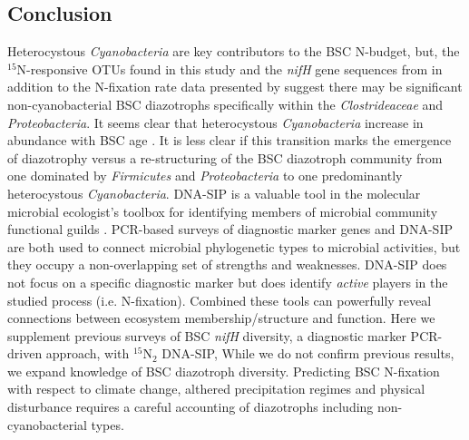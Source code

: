 \subsection{Conclusion}
Heterocystous \textit{Cyanobacteria} are key contributors to the BSC N-budget,
but, the $^{15}$N-responsive OTUs found in this study and the \textit{nifH}
gene sequences from \citet{Steppe_1996} in addition to the N-fixation rate data
presented by \citet{15643930} suggest there may be significant
non-cyanobacterial BSC diazotrophs specifically within the
\textit{Clostrideaceae} and \textit{Proteobacteria}. It seems clear that
heterocystous \textit{Cyanobacteria} increase in abundance with BSC age
\citep{14766579}. It is less clear if this transition marks the emergence of
diazotrophy versus a re-structuring of the BSC diazotroph community from one
dominated by \textit{Firmicutes} and \textit{Proteobacteria} to one
predominantly heterocystous \textit{Cyanobacteria}. DNA-SIP is a valuable tool
in the molecular microbial ecologist's toolbox for identifying members of
microbial community functional guilds \citep{17446886}. PCR-based surveys of
diagnostic marker genes and DNA-SIP are both used to connect microbial
phylogenetic types to microbial activities, but they occupy a non-overlapping
set of strengths and weaknesses. DNA-SIP does not focus on a specific diagnostic
marker but does identify \textit{active} players in the studied process (i.e. 
N-fixation). Combined these tools can powerfully reveal connections between
ecosystem membership/structure and function. Here we supplement previous
surveys of BSC \textit{nifH} diversity, a diagnostic marker PCR-driven
approach, with $^{15}$N$_{2}$ DNA-SIP, While we do not confirm previous
results, we expand knowledge of BSC diazotroph diversity.  Predicting BSC
N-fixation with respect to climate change, althered precipitation regimes and
physical disturbance requires a careful accounting of diazotrophs including
non-cyanobacterial types. 
